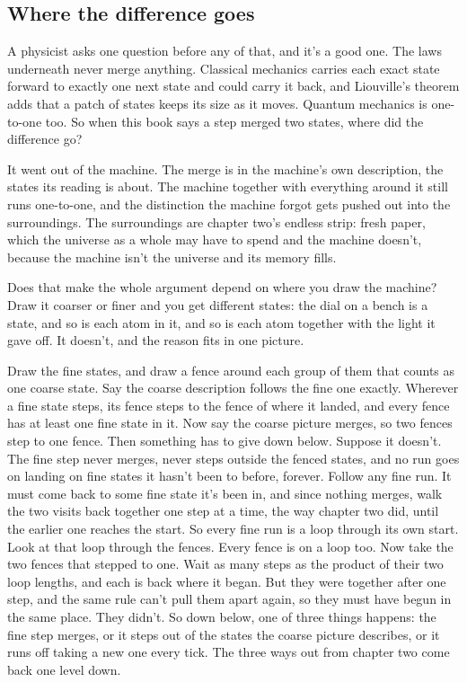 \documentclass[11pt,twoside]{article}
\theoremstyle{thielethm}
\theoremstyle{thieledef}
\theoremstyle{thieledef}
\theoremstyle{thieledef}
\theoremstyle{thielethm}
\theoremstyle{thieleobs}
\theoremstyle{thielethm}
\begin{document}
\subsection{Where the difference goes}

A physicist asks one question before any of that, and it's a good one. The laws underneath never merge anything. Classical mechanics carries each exact state forward to exactly one next state and could carry it back, and Liouville's theorem adds that a patch of states keeps its size as it moves. Quantum mechanics is one-to-one too. So when this book says a step merged two states, where did the difference go?

It went out of the machine. The merge is in the machine's own description, the states its reading is about. The machine together with everything around it still runs one-to-one, and the distinction the machine forgot gets pushed out into the surroundings. The surroundings are chapter two's endless strip: fresh paper, which the universe as a whole may have to spend and the machine doesn't, because the machine isn't the universe and its memory fills.

Does that make the whole argument depend on where you draw the machine? Draw it coarser or finer and you get different states: the dial on a bench is a state, and so is each atom in it, and so is each atom together with the light it gave off. It doesn't, and the reason fits in one picture.

Draw the fine states, and draw a fence around each group of them that counts as one coarse state. Say the coarse description follows the fine one exactly. Wherever a fine state steps, its fence steps to the fence of where it landed, and every fence has at least one fine state in it. Now say the coarse picture merges, so two fences step to one fence. Then something has to give down below. Suppose it doesn't. The fine step never merges, never steps outside the fenced states, and no run goes on landing on fine states it hasn't been to before, forever. Follow any fine run. It must come back to some fine state it's been in, and since nothing merges, walk the two visits back together one step at a time, the way chapter two did, until the earlier one reaches the start. So every fine run is a loop through its own start. Look at that loop through the fences. Every fence is on a loop too. Now take the two fences that stepped to one. Wait as many steps as the product of their two loop lengths, and each is back where it began. But they were together after one step, and the same rule can't pull them apart again, so they must have begun in the same place. They didn't. So down below, one of three things happens: the fine step merges, or it steps out of the states the coarse picture describes, or it runs off taking a new one every tick. The three ways out from chapter two come back one level down.
\end{document}
